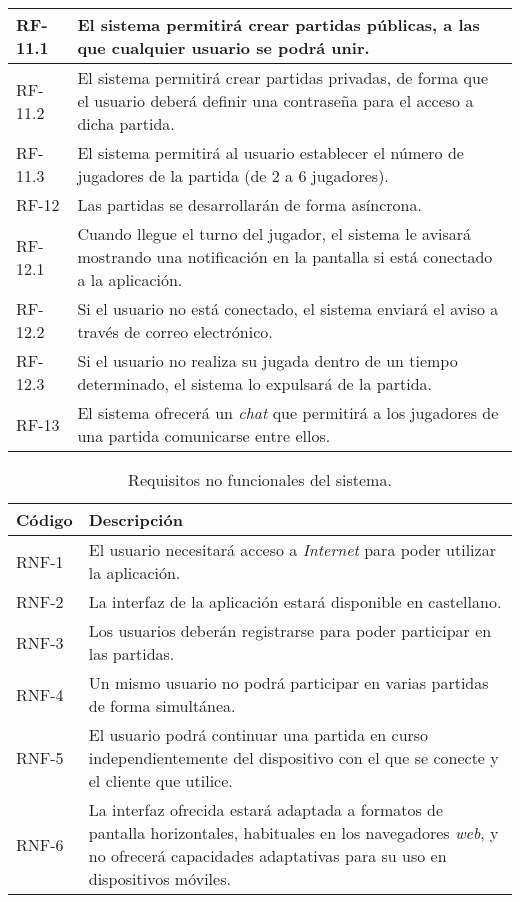 \documentclass[11pt, a4paper, titlepage]{article}
\begin{document}
\begin{longtable}[h!]{| p{} | p{} |}
         \hline
         RF-11.1 & El sistema permitirá crear partidas públicas, a las que cualquier usuario se podrá unir.\\
         \hline
         RF-11.2 & El sistema permitirá crear partidas privadas, de forma que el usuario deberá definir una contraseña para el acceso a dicha partida.\\
         \hline
         RF-11.3 & El sistema permitirá al usuario establecer el número de jugadores de la partida (de 2 a 6 jugadores).\\
         \hline
         RF-12 & Las partidas se desarrollarán de forma asíncrona.\\
         \hline
         RF-12.1 & Cuando llegue el turno del jugador, el sistema le avisará mostrando una notificación en la pantalla si está conectado a la aplicación.\\
         \hline
         RF-12.2 & Si el usuario no está conectado, el sistema enviará el aviso a través de correo electrónico.\\
         \hline
         RF-12.3 & Si el usuario no realiza su jugada dentro de un tiempo determinado, el sistema lo expulsará de la partida.\\
         \hline
         RF-13 & El sistema ofrecerá un \textit{chat} que permitirá a los jugadores de una partida comunicarse entre ellos.\\
         \hline
\end{longtable}

\newpage
\begin{table}[h!]
    \centering
    \begin{tabularx}{\textwidth}{|l|X|}
         \hline
         Código & Descripción \\
         \hline
         RNF-1 & El usuario necesitará acceso a \textit{Internet} para poder utilizar la aplicación.\\
         \hline
         RNF-2 & La interfaz de la aplicación estará disponible en castellano.\\
         \hline
         RNF-3 & Los usuarios deberán registrarse para poder participar en las partidas.\\
         \hline
         RNF-4 & Un mismo usuario no podrá participar en varias partidas de forma simultánea. \\
         \hline
         RNF-5 & El usuario podrá continuar una partida en curso independientemente del dispositivo con el que se conecte y el cliente que utilice.\\
         \hline
         RNF-6 & La interfaz ofrecida estará adaptada a formatos de pantalla horizontales, habituales en los navegadores \textit{web}, y no ofrecerá capacidades adaptativas para su uso en dispositivos móviles.\\
         \hline
    \end{tabularx}
    \caption{Requisitos no funcionales del sistema.}
    \label{tab:rnf}
\end{table}
\end{document}
